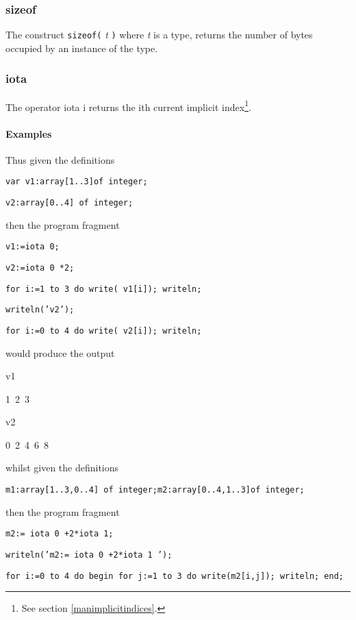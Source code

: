 {\subsubsection{sizeof}

The construct \texttt{sizeof(} \emph{t} \texttt{)} where \emph{t}
is a type, returns the number of bytes occupied by an instance
of the type.


\subsubsection{iota\label{iota}}

The operator iota i returns the ith current implicit index\footnote{%
See section \ref{manimplicitindices}.
}. 


\paragraph{Examples}

Thus given the definitions 

\texttt{var v1:array{[}1..3{]}of integer; }

\texttt{v2:array{[}0..4{]} of integer;}

then the program fragment

\texttt{v1:=iota 0;}

\texttt{v2:=iota 0 {*}2;}

\texttt{}

\texttt{for i:=1 to 3 do write( v1{[}i{]}); writeln; }

\texttt{writeln('v2'); }

\texttt{for i:=0 to 4 do write( v2{[}i{]}); writeln; }

would produce the output

\begin{lyxcode}
v1

1~2~3~

v2~

0~2~4~6~8
\end{lyxcode}
whilst given the definitions

\texttt{m1:array{[}1..3,0..4{]} of integer;m2:array{[}0..4,1..3{]}of integer;}

then the program fragment 

\texttt{m2:= iota 0 +2{*}iota 1; }

\texttt{writeln('m2:= iota 0 +2{*}iota 1 '); }

\texttt{for i:=0 to 4 do begin for j:=1 to 3 do write(m2{[}i,j{]}); writeln;
end; }

}
